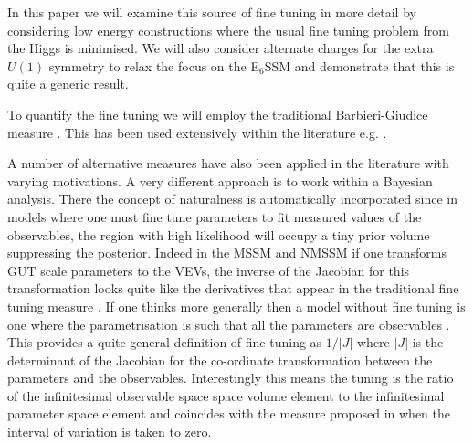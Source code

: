 \documentclass[preprint,amsmath,amssymb,aps,superscriptaddress,prd,showpacs,floatfix,nofootinbib]{revtex4-1}
\begin{document}
In this paper we will examine this source of fine tuning in more
detail by considering low energy constructions where the usual fine
tuning problem from the Higgs is minimised.  We will also consider
alternate charges for the extra $U(1)$ symmetry to relax the focus on
the E$_6$SSM and demonstrate that this is quite a generic result.

To quantify the fine tuning we will employ the traditional
Barbieri-Giudice measure \cite{Ellis:1986yg,Barbieri:1987fn}.  This
has been used extensively within the literature
e.g. \cite{deCarlos:1993yy, deCarlos:1993ca, Chankowski:1997zh,
  Agashe:1997kn, Wright:1998mk, Kane:1998im, BasteroGil:1999gu,
  Feng:1999zg, Allanach:2000ii, Dermisek:2005ar, Barbieri:2005kf,
  Allanach:2006jc, Gripaios:2006nn, Dermisek:2006py, Barbieri:2006dq,
  Kobayashi:2006fh, Perelstein:2012qg, Antusch:2012gv,Cheng:2012pe,
  CahillRowley:2012rv, Ross:2012nr, Basak:2012bd, Kang:2012sy,
  Athron:2013ipa,Miller:2013jra, Binjonaid:2014oga, Miller:2014jza}.

A number of alternative measures have also been applied in the
literature \cite{Anderson:1994dz, Anderson:1994tr, Anderson:1995cp,
  Anderson:1996ew, Ciafaloni:1996zh, Chan:1997bi, Barbieri:1998uv,
  Giusti:1998gz, Casas:2003jx, Casas:2004uu, Casas:2004gh,
  Casas:2006bd, Kitano:2005wc, Athron:2007ry, Athron:2007qr,
  Baer:2012up} with varying motivations.  A very different approach is
to work within a Bayesian analysis.  There the concept of naturalness
is automatically incorporated since in models where one must fine tune
parameters to fit measured values of the observables, the region with
high likelihood will occupy a tiny prior volume \cite{Allanach:2007qk,
  Cabrera:2008tj, Ghilencea:2012gz, Ghilencea:2012qk, Fichet:2012sn,
  Kim:2013uxa} suppressing the posterior.  Indeed in the MSSM and
NMSSM if one transforms GUT scale parameters to the VEVs, the inverse
of the Jacobian for this transformation looks quite like the
derivatives that appear in the traditional fine tuning measure
\cite{Allanach:2007qk, Cabrera:2008tj, Kim:2013uxa}.  If one thinks
more generally then a model without fine tuning is one where the
parametrisation is such that all the parameters are observables
\cite{Fichet:2012sn, Kim:2013uxa}.  This provides a quite general
definition of fine tuning as $1/|J|$ where $|J|$ is the determinant of
the Jacobian for the co-ordinate transformation between the parameters
and the observables. Interestingly this means the tuning is the ratio
of the infinitesimal observable space space volume element to the
infinitesimal parameter space element and coincides with the measure
proposed in \cite{Athron:2007ry} when the interval of variation is
taken to zero.
\end{document}
